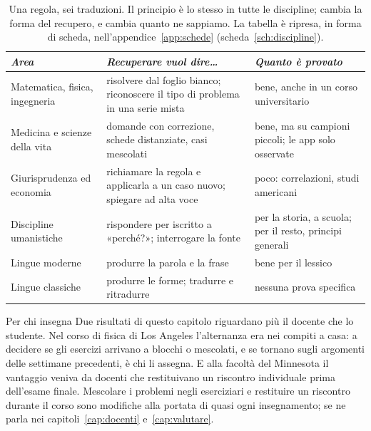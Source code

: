 \begin{table}[tbp]
  \centering\small
  \begin{tabular}{@{}>{\raggedright\arraybackslash}p{}>{\raggedright\arraybackslash}p{}>{\raggedright\arraybackslash}p{}@{}}
    \toprule
    \textit{Area} & \textit{Recuperare vuol dire\dots} & \textit{Quanto è provato} \\
    \midrule
    Matematica, fisica, ingegneria & risolvere dal foglio bianco;
      riconoscere il tipo di problema in una serie mista & bene, anche
      in un corso universitario \\
    \addlinespace
    Medicina e scienze della vita & domande con correzione, schede
      distanziate, casi mescolati & bene, ma su campioni piccoli; le
      app solo osservate \\
    \addlinespace
    Giurisprudenza ed economia & richiamare la regola e applicarla a un
      caso nuovo; spiegare ad alta voce & poco: correlazioni, studi
      americani \\
    \addlinespace
    Discipline umanistiche & rispondere per iscritto a «perché?»;
      interrogare la fonte & per la storia, a scuola; per il resto,
      principi generali \\
    \addlinespace
    Lingue moderne & produrre la parola e la frase & bene per il
      lessico \\
    \addlinespace
    Lingue classiche & produrre le forme; tradurre e ritradurre &
      nessuna prova specifica \\
    \bottomrule
  \end{tabular}
  \caption{Una regola, sei traduzioni. Il principio è lo stesso in
    tutte le discipline; cambia la forma del recupero, e cambia quanto
    ne sappiamo. La tabella è ripresa, in forma di scheda,
    nell'appendice~\ref{app:schede} (scheda~\ref{sch:discipline}).}
  \label{tab:discipline}
\end{table}

\begin{riquadro}{Per chi insegna}
Due risultati di questo capitolo riguardano più il docente che lo
studente. Nel corso di fisica di Los Angeles l'alternanza era nei
compiti a casa: a decidere se gli esercizi arrivano a blocchi o
mescolati, e se tornano sugli argomenti delle settimane precedenti, è
chi li assegna. E alla facoltà del Minnesota il vantaggio veniva da
docenti che restituivano un riscontro individuale prima dell'esame
finale. Mescolare i problemi negli eserciziari e restituire un
riscontro durante il corso sono modifiche alla portata di quasi ogni
insegnamento; se ne parla nei capitoli~\ref{cap:docenti}
e~\ref{cap:valutare}.
\end{riquadro}


